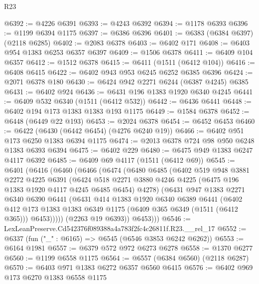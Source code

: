 \begin{lexlean}{R23}
\begin{coremodule}
@6392 := @4226 @6391
@6393 := @4243 @6392
@6394 := @1178 @6393
@6396 := @1199 @6394 @1175
@6397 := @6386 @6396
@6401 := @6383 (@6384 @6397) (@2118 @6285)
@6402 := @2083 @6378
@6403 := @6402 @171
@6408 := @6403 @954 @1383 @6253 @6357 @6397
@6409 := @1506 @6378
@6411 := @6409 @104 @6357
@6412 := @1512 @6378
@6415 := @6411 (@1511 (@6412 @104))
@6416 := @6408 @6415
@6422 := @6402 @943 @953 @6245 @6252 @6385 @6396
@6424 := @2071 @6378 @180
@6430 := @6424 @942 @2271 @6244 (@6387 @4245) @6385
@6431 := @6402 @924
@6436 := @6431 @196 @1383 @1920 @6340 @4245
@6441 := @6409 @532 @6340 (@1511 (@6412 @532))
@6442 := @6436 @6441
@6448 := @6402 @194 @173 @1383 @1383 @193 @1175
@6449 := @1584 @6378
@6452 := @6448 (@6449 @22 @193)
@6453 := @2024 @6378
@6454 := @6452 @6453
@6460 := @6422 (@6430 (@6442 @6454) (@4276 @6240 @19))
@6466 := @6402 @951 @173 @6250 @1383 @6394 @1175
@6474 := @2013 @6378 @724 @98 @950 @6248 @1383 @6393 @6394
@6475 := @6402 @229
@6480 := @6475 @949 @1383 @6247 @4117 @6392
@6485 := @6409 @69 @4117 (@1511 (@6412 @69))
@6545 := @6401
    (@6416
      (@6460
        (@6466
          (@6474
            (@6480
              @6485
              (@6402
                @519
                @948
                @3881
                @2272
                @4225
                @6391
                (@6424
                  @518
                  @2271
                  @3880
                  @4246
                  @4225
                  (@6475 @196 @1383 @1920 @4117 @4245 @6485 @6454)
                  @4278)
                (@6431
                  @947
                  @1383
                  @2271
                  @6340
                  @6390
                  @6441
                  (@6431
                    @414
                    @1383
                    @1920
                    @6340
                    @6389
                    @6441
                    (@6402
                      @412
                      @173
                      @1383
                      @1383
                      @6349
                      @1175
                      (@6409 @365 @6349 (@1511 (@6412 @365)))
                      @6453)))))
            (@2263 @19 @6393))
          @6453)))
@6546 := LexLeanPreserve.Cd542376f089388a4a783f2fc4c26811f.R23.__rel_17
@6552 := @6337 (fun ("_" : @6165) => @6545 (@6546 @3853 @6242 @6262))
@6553 := @6164 @1981
@6557 := @6379 @572 @972 @6273 @6278
@6558 := @1370 @6277
@6560 := @1199 @6558 @1175
@6564 := @6557 (@6384 @6560) (@2118 @6287)
@6570 := @6403 @971 @1383 @6272 @6357 @6560 @6415
@6576 := @6402 @969 @173 @6270 @1383 @6558 @1175

\end{coremodule}
\end{lexlean}
